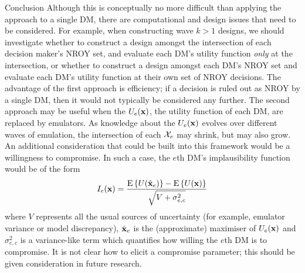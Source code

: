 \begin{chapter}{Conclusion \label{Ch:conclusions}}
Although this is conceptually no more difficult than applying the approach to a single DM, there are computational and design issues that need to be considered. For example, when  constructing wave $k>1$ designs, we should investigate whether to  construct a design amongst the intersection of each decision maker's NROY set, and evaluate each DM's utility function \textit{only} at the intersection, or whether to construct a design amongst each DM's NROY set and evaluate each DM's utility function at their own set of NROY decisions. The advantage of the first approach is efficiency; if a decision is ruled out as NROY by a single DM, then it would not typically be considered any further. The second approach may be useful when the $U_e(\mathbf{x})$, the utility function of each DM, are replaced by emulators. As knowledge about the $U_e(\mathbf{x})$ evolves  over different waves of emulation, the intersection of each $\mathcal{X}_e$ may shrink, but may also grow. An additional consideration that could be built into this framework would be a willingness to compromise. In such a case, the $e$th DM's implausibility function would be of the form
\begin{equation}
  I_e(\mathbf{x}) = \frac{ \textrm{E}\,\{U(\hat{\mathbf{x}}_e)\} - \textrm{E}\,\{U(\mathbf{x})\} } {\sqrt{V + \sigma^2_{e,c}}}
\end{equation}
where $V$ represents all the usual sources of uncertainty (for example, emulator variance or model discrepancy), $\hat{\mathbf{x}}_e$ is the (approximate) maximiser of $U_e(\mathbf{x})$ and $\sigma^2_{e, c}$  is a variance-like term which quantifies how willing the $e$th DM is to compromise. It is not clear how to elicit a compromise parameter; this should be given consideration in future research.
\end{chapter}
